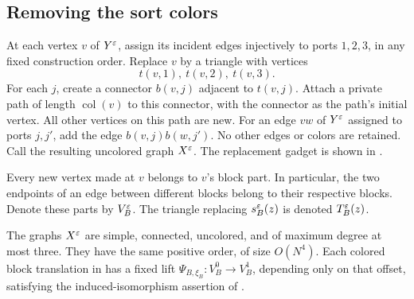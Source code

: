 \subsection{Removing the sort colors}

At each vertex \(v\) of \(Y^\varepsilon\), assign its incident edges injectively
to ports \(1,2,3\), in any fixed construction order.
Replace \(v\) by a triangle with vertices
\[
                       t(v,1),\ t(v,2),\ t(v,3).
\]
For each \(j\), create a connector \(b(v,j)\) adjacent to \(t(v,j)\).
Attach a private path of length \(\operatorname{col}(v)\) to this
connector, with the connector as the path's initial vertex.
All other vertices on this path are new.
For an edge \(vw\) of \(Y^\varepsilon\) assigned to ports \(j,j'\), add the
edge \(b(v,j)b(w,j')\).
No other edges or colors are retained.
Call the resulting uncolored graph \(X^\varepsilon\).
The replacement gadget is shown in .

Every new vertex made at \(v\) belongs to \(v\)'s block part.
In particular, the two endpoints of an edge between different blocks
belong to their respective blocks.
Denote these parts by \(V_B^\varepsilon\).
The triangle replacing \(s_B^\varepsilon(z)\) is denoted \(T_B^\varepsilon(z)\).



\begin{lemma}
\label{graph:uncolored-lifts}
The graphs \(X^\varepsilon\) are simple, connected, uncolored, and of maximum
degree at most three.  They have the same positive order, of size
\(O(N^4)\).
Each colored block translation in 
has a fixed lift \(\Psi_{B,\xi_B}:V_B^0\to V_B^1\), depending only
on that offset, satisfying the induced-isomorphism assertion of
.
\end{lemma}

